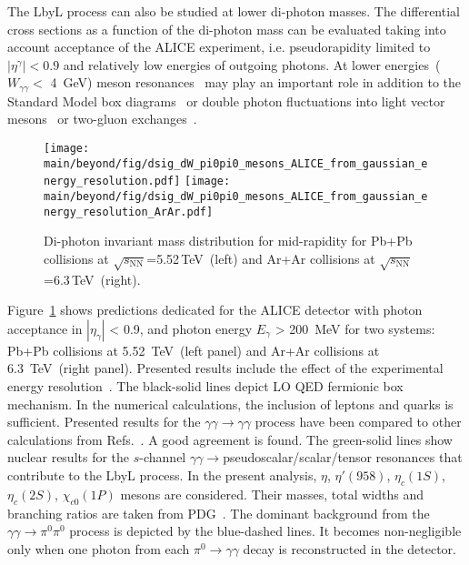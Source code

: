 The LbyL process can also be studied at lower di-photon masses. The differential cross sections as a function of the di-photon mass can be evaluated taking into account acceptance of the ALICE experiment, i.e. pseudorapidity limited to $|\eta^\gamma|<0.9$ and relatively low energies of outgoing photons. At lower energies~($W_{\gamma\gamma} <$ 4~GeV) meson resonances~\cite{Klusek-Gawenda:2018ijg} may play an important role in addition to the Standard Model box diagrams~\cite{dEnterria:2013zqi,Klusek-Gawenda:2016euz}
or double photon fluctuations into light vector mesons~\cite{Klusek-Gawenda:2016euz} or two-gluon exchanges~\cite{Klusek-Gawenda:2016nuo}.
\begin{figure}[!h]
        \texttt{[image: \\main/beyond/fig/dsig\_dW\_pi0pi0\_mesons\_ALICE\_from\_gaussian\_energy\_resolution.pdf]}
        \texttt{[image: \\main/beyond/fig/dsig\_dW\_pi0pi0\_mesons\_ALICE\_from\_gaussian\_energy\_resolution\_ArAr.pdf]}
        \caption{
                Di-photon invariant mass distribution for mid-rapidity for Pb+Pb collisions at $\sqrt{s_{\mathrm{NN}}}$=5.52\,TeV~(left) and Ar+Ar collisions at $\sqrt{s_{\mathrm{NN}}}$=6.3\,TeV~(right).
        }
        \label{fig:lbyl_alice}
\end{figure}
Figure~\ref{fig:lbyl_alice} shows predictions dedicated for the ALICE detector with photon acceptance in $|\eta_{\gamma}|$ < 0.9, and photon energy $E_{\gamma}$ > 200~MeV for two systems: Pb+Pb collisions at 5.52~TeV~(left panel) and Ar+Ar collisions at 6.3~TeV~(right panel). Presented results include the effect of the experimental energy resolution~\cite{Acharya:2018yhg}.
The black-solid lines depict LO QED fermionic box mechanism.
In the numerical calculations, the inclusion of leptons and quarks is sufficient. Presented results for the $\gamma\gamma\to\gamma\gamma$ process have been compared to other calculations from Refs.~\cite{Jikia:1993tc,Bern:2001dg,Bardin:2009gq}. A good agreement is found. The green-solid lines show nuclear results for the $s$-channel $\gamma\gamma\to$pseudoscalar/scalar/tensor resonances that contribute to the LbyL process.
In the present analysis, $\eta$, $\eta'(958)$, $\eta_c(1S)$, $\eta_c(2S)$, $\chi_{c0}(1P)$ mesons are considered.
Their masses, total widths and branching ratios are taken from PDG~\cite{Patrignani:2016xqp}.
The dominant background from the $\gamma\gamma\to\pi^0\pi^0$
process is depicted by the blue-dashed lines. It becomes non-negligible  only when one photon from each $\pi^0\to\gamma\gamma$ decay is reconstructed in the detector.
